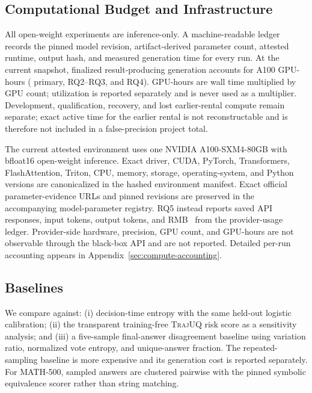\documentclass[10pt]{article}
\newcommand{\method}{\textsc{TrajUQ}\xspace}
\begin{document}
\subsection{Computational Budget and Infrastructure}

All open-weight experiments are inference-only. A machine-readable ledger
records the pinned model revision, artifact-derived parameter count, attested
runtime, output hash, and measured generation time for every run. At the
current \ComputeLedgerStatus{} snapshot, finalized result-producing generation
accounts for \TotalAuthoritativeGPUHours{} A100 GPU-hours
(\TotalPrimaryGPUHours{} primary, \TotalRQTwoThreeGPUHours{} RQ2--RQ3, and
\TotalRQFourGPUHours{} RQ4). GPU-hours are wall time multiplied by GPU count;
utilization is reported separately and is never used as a multiplier.
Development, qualification, recovery, and lost earlier-rental compute remain
separate; exact active time for the earlier rental is not reconstructable and
is therefore not included in a false-precision project total.

The current attested environment uses one NVIDIA A100-SXM4-80GB with
bfloat16 open-weight inference. Exact driver, CUDA, PyTorch, Transformers,
FlashAttention, Triton, CPU, memory, storage, operating-system, and Python
versions are canonicalized in the hashed environment manifest. Exact official
parameter-evidence URLs and pinned revisions are preserved in the accompanying
model-parameter registry. RQ5 instead
reports \RQFiveRequests{} saved API responses, \RQFiveInputTokens{} input
tokens, \RQFiveOutputTokens{} output tokens, and RMB~\RQFiveCostRMB{} from the
provider-usage ledger. Provider-side hardware, precision, GPU count, and
GPU-hours are not observable through the black-box API and are not reported.
Detailed per-run accounting appears in Appendix~\ref{sec:compute-accounting}.

\ComputeBudgetTable

\subsection{Baselines}

We compare against:
(i) decision-time entropy with the same held-out logistic calibration;
(ii) the transparent training-free \method risk score as a sensitivity analysis; and
(iii) a five-sample final-answer disagreement baseline using variation ratio, normalized vote entropy, and unique-answer fraction.
The repeated-sampling baseline is more expensive and its generation cost is reported separately.
For MATH-500, sampled answers are clustered pairwise with the pinned symbolic equivalence scorer rather than string matching.
\end{document}
